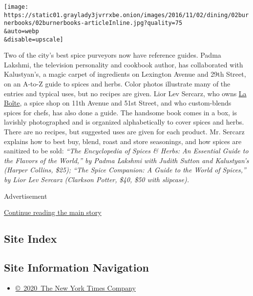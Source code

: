 \texttt{[image: https://static01.graylady3jvrrxbe.onion/images/2016/11/02/dining/02burnerbooks/02burnerbooks-articleInline.jpg?quality=75\\\&auto=webp\\\&disable=upscale]}

Two of the city's best spice purveyors now have reference guides. Padma
Lakshmi, the television personality and cookbook author, has
collaborated with Kalustyan's, a magic carpet of ingredients on
Lexington Avenue and 29th Street, on an A-to-Z guide to spices and
herbs. Color photos illustrate many of the entries and typical uses, but
no recipes are given. Lior Lev Sercarz, who owns
\href{http://laboiteny.com/}{La Boîte}, a spice shop on 11th Avenue and
51st Street, and who custom-blends spices for chefs, has also done a
guide. The handsome book comes in a box, is lavishly photographed and is
organized alphabetically to cover spices and herbs. There are no
recipes, but suggested uses are given for each product. Mr. Sercarz
explains how to best buy, blend, roast and store seasonings, and how
spices are sanitized to be sold: \emph{``The Encyclopedia of Spices \&
Herbs: An Essential Guide to the Flavors of the World,'' by Padma
Lakshmi with Judith Sutton and Kalustyan's (Harper Collins, \$25); ``The
Spice Companion: A Guide to the World of Spices,'' by Lior Lev Sercarz
(Clarkson Potter, \$40, \$50 with slipcase).}

Advertisement

\protect\hyperlink{after-bottom}{Continue reading the main story}

\hypertarget{site-index}{%
\subsection{Site Index}\label{site-index}}

\hypertarget{site-information-navigation}{%
\subsection{Site Information
Navigation}\label{site-information-navigation}}

\begin{itemize}
\tightlist
\item
  \href{https://help.nytimes3xbfgragh.onion/hc/en-us/articles/115014792127-Copyright-notice}{©~2020~The
  New York Times Company}
\end{itemize}

